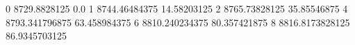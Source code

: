 0 8729.8828125 0.0
1 8744.46484375 14.58203125
2 8765.73828125 35.85546875
4 8793.341796875 63.458984375
6 8810.240234375 80.357421875
8 8816.8173828125 86.9345703125
